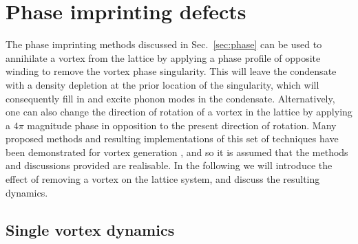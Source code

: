 \section{Phase imprinting defects}\label{sec:phase_def}

The phase imprinting methods discussed in Sec.~\ref{sec:phase} can be used to annihilate a vortex from the lattice by applying a phase profile of opposite winding to remove the vortex phase singularity.  This will leave the condensate with a density depletion at the prior location of the singularity, which will consequently fill in and excite phonon modes in the condensate. Alternatively, one can also change the direction of rotation of a vortex in the lattice by applying a $4\pi$ magnitude phase in opposition to the present direction of rotation. Many proposed methods and resulting implementations of this set of techniques have been demonstrated for vortex generation \cite{Vtx:Dobrek_pra_1999,VTX:Nakahara_physb_2000,VTX:Kawaguchi_pra_2004_2,VTX:Leanhardt_prl_2002,VTX:Kuwamoto_jpsj_2010,VTX:Brachmann_osa_2011}, and so it is assumed that the methods and discussions provided are realisable. In the following we will introduce the effect of removing a vortex on the lattice system, and discuss the resulting dynamics.

\subsection{Single vortex dynamics}

